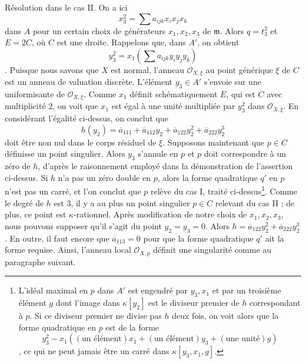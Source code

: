 \medskip\noindent Résolution dans le cas II. On a ici $$
x_3^2 = \sum a_{ijk}x_ix_jx_k
$$ dans $A$ pour un certain choix de générateurs $x_1, x_2, x_3$ de $\mathfrak m$. Alors $q = t_3^2$ et $E = 2C$, où $C$ est une droite. Rappelons que, dans $A'$, on obtient $$
y_3^2 = x_1(\sum a_{ijk} y_iy_jy_k)
$$. Puisque nous savons que $X$ est normal, l'anneau $\mathcal{O}_{X, \xi}$ au point générique $\xi$ de $C$ est un anneau de valuation discrète. L'élément $y_3 \in A'$ s'envoie sur une uniformisante de $\mathcal{O}_{X, \xi}$. Comme $x_1$ définit schématiquement $E$, qui est $C$ avec multiplicité $2$, on voit que $x_1$ est égal à une unité multipliée par $y_3^2$ dans $\mathcal{O}_{X, \xi}$. En considérant l'égalité ci-dessus, on conclut que $$
h(y_2) = \overline{a}_{111} + \overline{a}_{112} y_2 +
\overline{a}_{122} y_2^2 +
\overline{a}_{222} y_2^3
$$ doit être non nul dans le corps résiduel de $\xi$. Supposons maintenant que $p \in C$ définisse un point singulier. Alors $y_3$ s'annule en $p$ et $p$ doit correspondre à un zéro de $h$, d'après le raisonnement employé dans la démonstration de l'assertion ci-dessus. Si $h$ n'a pas un zéro double en $p$, alors la forme quadratique $q'$ en $p$ n'est pas un carré, et l'on conclut que $p$ relève du cas I, traité ci-dessus\footnote{L'idéal maximal en $p$ dans $A'$ est engendré par $y_3, x_1$ et par un troisième élément $g$ dont l'image dans $\kappa[y_2]$ est le diviseur premier de $h$ correspondant à $p$. Si ce diviseur premier ne divise pas $h$ deux fois, on voit alors que la forme quadratique en $p$ est de la forme $$
y_3^2 - x_1((\text{un élément})x_1 + (\text{un élément})y_3 + (\text{une unité})g)
$$, ce qui ne peut jamais être un carré dans $\kappa[y_3, x_1, g]$.}. Comme le degré de $h$ est $3$, il y a au plus un point singulier $p \in C$ relevant du cas II ; de plus, ce point est $\kappa$-rationnel. Après modification de notre choix de $x_1, x_2, x_3$, nous pouvons supposer qu'il s'agit du point $y_2 = y_3 = 0$. Alors $h = \overline{a}_{122} y_2^2 + \overline{a}_{222} y_2^3$. En outre, il faut encore que $\overline{a}_{113} = 0$ pour que la forme quadratique $q'$ ait la forme requise. Ainsi, l'anneau local $\mathcal{O}_{X, p}$ définit une singularité comme au paragraphe suivant.

